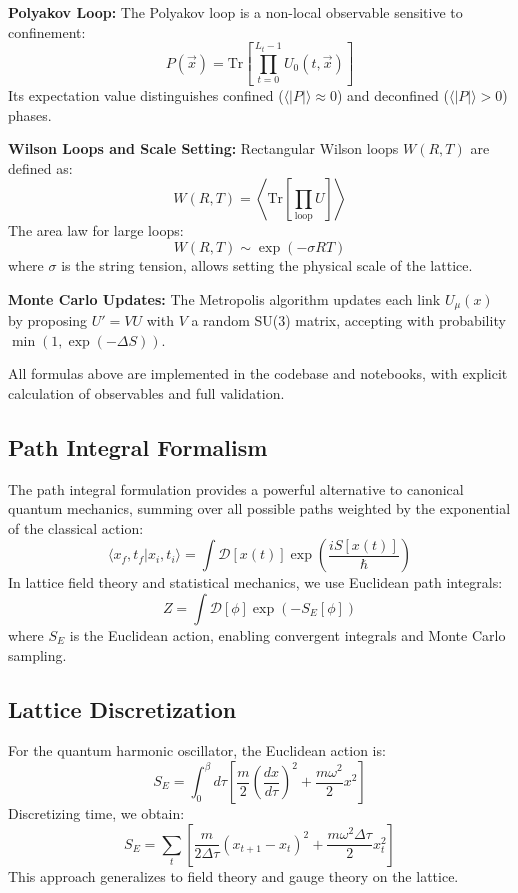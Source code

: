 \documentclass[12pt]{article}
\begin{document}
\textbf{Polyakov Loop:}
The Polyakov loop is a non-local observable sensitive to confinement:
\begin{equation}
P(\vec{x}) = \text{Tr} \left[ \prod_{t=0}^{L_t-1} U_0(t, \vec{x}) \right]
\end{equation}
Its expectation value distinguishes confined ($\langle |P| \rangle \approx 0$) and deconfined ($\langle |P| \rangle > 0$) phases.

\textbf{Wilson Loops and Scale Setting:}
Rectangular Wilson loops $W(R,T)$ are defined as:
\begin{equation}
W(R,T) = \left\langle \text{Tr} \left[ \prod_{\text{loop}} U \right] \right\rangle
\end{equation}
The area law for large loops:
\begin{equation}
W(R,T) \sim \exp(-\sigma R T)
\end{equation}
where $\sigma$ is the string tension, allows setting the physical scale of the lattice.

\textbf{Monte Carlo Updates:}
The Metropolis algorithm updates each link $U_\mu(x)$ by proposing $U' = V U$ with $V$ a random SU(3) matrix, accepting with probability $\min(1, \exp(-\Delta S))$.

All formulas above are implemented in the codebase and notebooks, with explicit calculation of observables and full validation.
\subsection{Path Integral Formalism}
The path integral formulation provides a powerful alternative to canonical quantum mechanics, summing over all possible paths weighted by the exponential of the classical action:
\begin{equation}
\langle x_f, t_f | x_i, t_i \rangle = \int \mathcal{D}[x(t)] \exp\left(\frac{i S[x(t)]}{\hbar}\right)
\end{equation}
In lattice field theory and statistical mechanics, we use Euclidean path integrals:
\begin{equation}
Z = \int \mathcal{D}[\phi] \exp(-S_E[\phi])
\end{equation}
where $S_E$ is the Euclidean action, enabling convergent integrals and Monte Carlo sampling.

\subsection{Lattice Discretization}
For the quantum harmonic oscillator, the Euclidean action is:
\begin{equation}
S_E = \int_0^\beta d\tau \left[ \frac{m}{2} \left(\frac{dx}{d\tau}\right)^2 + \frac{m\omega^2}{2} x^2 \right]
\end{equation}
Discretizing time, we obtain:
\begin{equation}
S_E = \sum_t \left[ \frac{m}{2\Delta\tau} (x_{t+1} - x_t)^2 + \frac{m\omega^2 \Delta\tau}{2} x_t^2 \right]
\end{equation}
This approach generalizes to field theory and gauge theory on the lattice.
\end{document}
